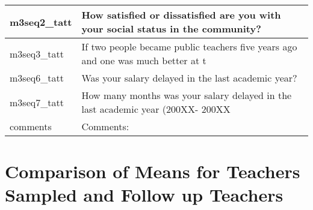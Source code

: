 \documentclass[
]{article}
\begin{document}
\begin{table}
\begin{tabular}[t]{l|l}
\hline
m3seq2\_tatt & How satisfied or dissatisfied are you with your social status in the community?\\
\hline
m3seq3\_tatt & If two people became public teachers five years ago and one was much better at t\\
\hline
m3seq6\_tatt & Was your  salary delayed in the last academic year?\\
\hline
m3seq7\_tatt & How many months was your  salary delayed in the last academic year (200XX- 200XX\\
\hline
comments & Comments:\\
\hline
\end{tabular}
\end{table}

\hypertarget{comparison-of-means-for-teachers-sampled-and-follow-up-teachers}{%
\section{Comparison of Means for Teachers Sampled and Follow up
Teachers}\label{comparison-of-means-for-teachers-sampled-and-follow-up-teachers}}
\end{document}
